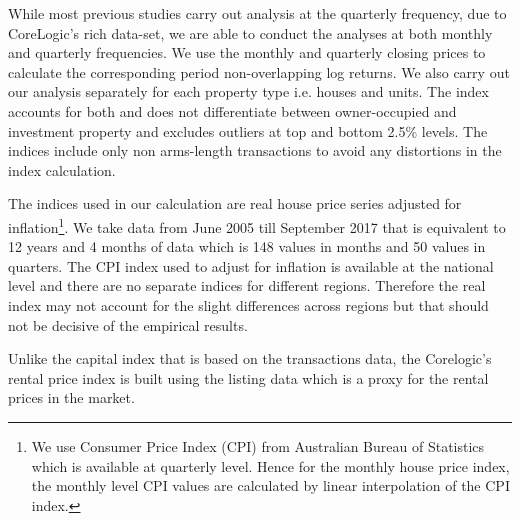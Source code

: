 \documentclass[AEJ,reqno, draftmode]{AEA}
\begin{document}
While most previous studies carry out analysis at the quarterly frequency, due to CoreLogic's rich data-set, we are able to conduct the analyses at both monthly and quarterly frequencies. We use the monthly and quarterly closing prices to calculate the corresponding period non-overlapping log returns. We also carry out our analysis separately for each property type i.e. houses and units. The index accounts for both and does not differentiate between owner-occupied and investment property and excludes outliers at top and bottom 2.5\% levels. The indices include only non arms-length transactions to avoid any distortions in the index calculation. 

The indices used in our calculation are real house price series adjusted for inflation\footnote{We use Consumer Price Index (CPI) from Australian Bureau of Statistics which is available at quarterly level. Hence for the monthly house price index, the monthly level CPI values are calculated by linear interpolation of the CPI index.}. We take data from June 2005 till September 2017 that is equivalent to 12 years and 4 months of data which is 148 values in months and 50 values in quarters. The CPI index used to adjust for inflation is available at the national level and there are no separate indices for different regions. Therefore the real index may not account for the slight differences across regions but that should not be decisive of the empirical results.

Unlike the capital index that is based on the transactions data, the Corelogic's rental price index is built using the listing data which is a proxy for the rental prices in the market. 

\end{document}
